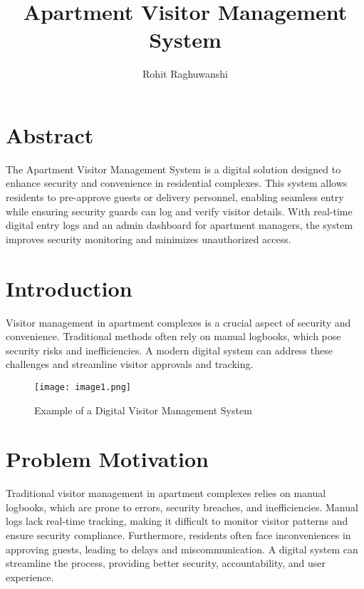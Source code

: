 \documentclass[sigconf]{acmart}
\title{Apartment Visitor Management System}
\author{Rohit Raghuwanshi}
\affiliation{
  \institution{IIT Bhilai}
  \city{Durg}
  \country{India}
}
\begin{document}
\maketitle

\section*{Abstract}
The Apartment Visitor Management System is a digital solution designed to enhance security and convenience in residential complexes. This system allows residents to pre-approve guests or delivery personnel, enabling seamless entry while ensuring security guards can log and verify visitor details. With real-time digital entry logs and an admin dashboard for apartment managers, the system improves security monitoring and minimizes unauthorized access.

\section{Introduction}
Visitor management in apartment complexes is a crucial aspect of security and convenience. Traditional methods often rely on manual logbooks, which pose security risks and inefficiencies. A modern digital system can address these challenges and streamline visitor approvals and tracking.

\begin{figure}[h]
\centering
\texttt{[image: image1.png]}
\caption{Example of a Digital Visitor Management System}
\label{fig:visitor_system}
\end{figure}

\section{Problem Motivation}
Traditional visitor management in apartment complexes relies on manual logbooks, which are prone to errors, security breaches, and inefficiencies. Manual logs lack real-time tracking, making it difficult to monitor visitor patterns and ensure security compliance. Furthermore, residents often face inconveniences in approving guests, leading to delays and miscommunication. A digital system can streamline the process, providing better security, accountability, and user experience.
\end{document}
